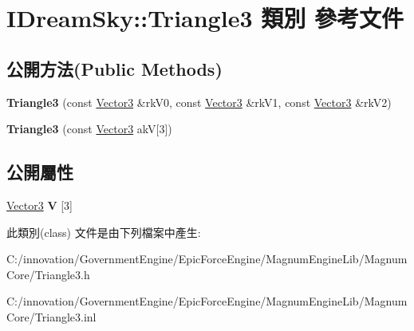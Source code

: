 \hypertarget{class_i_dream_sky_1_1_triangle3}{}\section{I\+Dream\+Sky\+:\+:Triangle3 類別 參考文件}
\label{class_i_dream_sky_1_1_triangle3}
\subsection*{公開方法(Public Methods)}
\begin{DoxyCompactItemize}
\item 
{\bfseries Triangle3} (const \hyperlink{class_i_dream_sky_1_1_vector3}{Vector3} \&rk\+V0, const \hyperlink{class_i_dream_sky_1_1_vector3}{Vector3} \&rk\+V1, const \hyperlink{class_i_dream_sky_1_1_vector3}{Vector3} \&rk\+V2)\hypertarget{class_i_dream_sky_1_1_triangle3_a30e493be9581f16b3c88aa57d726edfb}{}\label{class_i_dream_sky_1_1_triangle3_a30e493be9581f16b3c88aa57d726edfb}

\item 
{\bfseries Triangle3} (const \hyperlink{class_i_dream_sky_1_1_vector3}{Vector3} akV\mbox{[}3\mbox{]})\hypertarget{class_i_dream_sky_1_1_triangle3_aa1bcd284156522edd46365f0ea2e1089}{}\label{class_i_dream_sky_1_1_triangle3_aa1bcd284156522edd46365f0ea2e1089}

\end{DoxyCompactItemize}
\subsection*{公開屬性}
\begin{DoxyCompactItemize}
\item 
\hyperlink{class_i_dream_sky_1_1_vector3}{Vector3} {\bfseries V} \mbox{[}3\mbox{]}\hypertarget{class_i_dream_sky_1_1_triangle3_a3b04fd84364c76ec8c3a653d79da0115}{}\label{class_i_dream_sky_1_1_triangle3_a3b04fd84364c76ec8c3a653d79da0115}

\end{DoxyCompactItemize}


此類別(class) 文件是由下列檔案中產生\+:\begin{DoxyCompactItemize}
\item 
C\+:/innovation/\+Government\+Engine/\+Epic\+Force\+Engine/\+Magnum\+Engine\+Lib/\+Magnum\+Core/Triangle3.\+h\item 
C\+:/innovation/\+Government\+Engine/\+Epic\+Force\+Engine/\+Magnum\+Engine\+Lib/\+Magnum\+Core/Triangle3.\+inl\end{DoxyCompactItemize}
